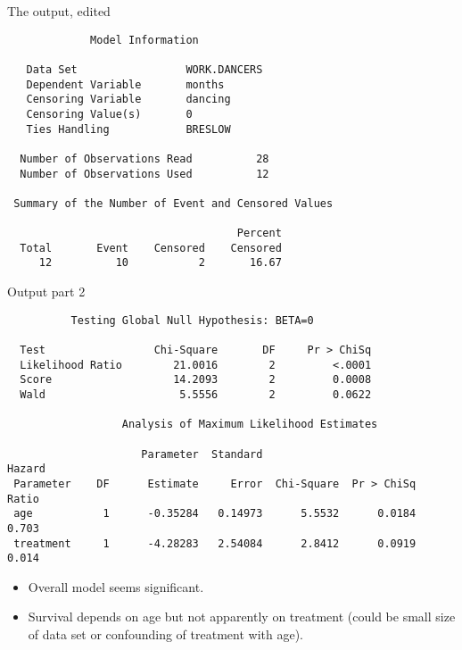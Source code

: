 \documentclass[pdf]{prosper}
\begin{document}
\begin{slide}{The output, edited}

{\scriptsize
\begin{verbatim}
             Model Information

   Data Set                 WORK.DANCERS
   Dependent Variable       months
   Censoring Variable       dancing
   Censoring Value(s)       0
   Ties Handling            BRESLOW

  Number of Observations Read          28
  Number of Observations Used          12

 Summary of the Number of Event and Censored Values

                                    Percent
  Total       Event    Censored    Censored
     12          10           2       16.67
\end{verbatim}
}
  
\end{slide}

\begin{slide}{Output part 2}

{\scriptsize
\begin{verbatim}
          Testing Global Null Hypothesis: BETA=0

  Test                 Chi-Square       DF     Pr > ChiSq
  Likelihood Ratio        21.0016        2         <.0001
  Score                   14.2093        2         0.0008
  Wald                     5.5556        2         0.0622

                  Analysis of Maximum Likelihood Estimates

                     Parameter  Standard                         Hazard
 Parameter    DF      Estimate     Error  Chi-Square  Pr > ChiSq  Ratio
 age           1      -0.35284   0.14973      5.5532      0.0184  0.703
 treatment     1      -4.28283   2.54084      2.8412      0.0919  0.014

\end{verbatim}
}

\begin{itemize}
\item Overall model seems significant.
\item Survival depends on age but not apparently on treatment (could be small size of data set or confounding of treatment with age).
\end{itemize}

  
\end{slide}
\end{document}
